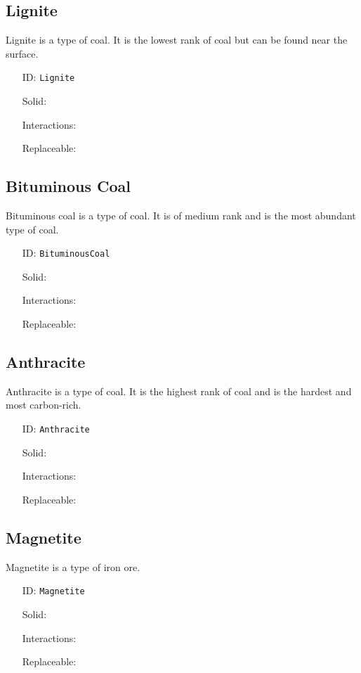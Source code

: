 \subsection{Lignite}\label{subsec:blocks_lignite}
Lignite is a type of coal.
                It is the lowest rank of coal but can be found near the surface.
\newline
\begin{itemize}[nosep]
\item[ID:] \texttt{Lignite}
\item[Solid:]  \Checkmark \item[Interactions:]  \XSolidBrush \item[Replaceable:]  \XSolidBrush \end{itemize}

\subsection{Bituminous Coal}\label{subsec:blocks_bituminous coal}
Bituminous coal is a type of coal.
                It is of medium rank and is the most abundant type of coal.
\newline
\begin{itemize}[nosep]
\item[ID:] \texttt{BituminousCoal}
\item[Solid:]  \Checkmark \item[Interactions:]  \XSolidBrush \item[Replaceable:]  \XSolidBrush \end{itemize}

\subsection{Anthracite}\label{subsec:blocks_anthracite}
Anthracite is a type of coal.
                It is the highest rank of coal and is the hardest and most carbon-rich.
\newline
\begin{itemize}[nosep]
\item[ID:] \texttt{Anthracite}
\item[Solid:]  \Checkmark \item[Interactions:]  \XSolidBrush \item[Replaceable:]  \XSolidBrush \end{itemize}

\subsection{Magnetite}\label{subsec:blocks_magnetite}
Magnetite is a type of iron ore.
\newline
\begin{itemize}[nosep]
\item[ID:] \texttt{Magnetite}
\item[Solid:]  \Checkmark \item[Interactions:]  \XSolidBrush \item[Replaceable:]  \XSolidBrush \end{itemize}

